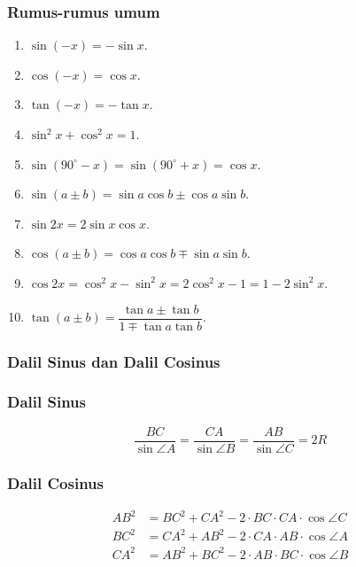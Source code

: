 \documentclass[11pt]{scrartcl}
\begin{document}
\subsubsection{Rumus-rumus umum}
\begin{enumerate}
    \item $\sin (-x) = -\sin x$.
    \item $\cos (-x) = \cos x$.
    \item $\tan(-x) = -\tan x$.
    \item $\sin^2 x + \cos^2 x = 1$.
    \item $\sin(90^\circ-x)=\sin(90^\circ+x)=\cos x$.
    \item $\sin(a \pm b) = \sin a \cos b \pm \cos a \sin b$.
    \item $\sin 2x = 2\sin x \cos x$.
    \item $\cos(a \pm b) = \cos a \cos b \mp \sin a \sin b$.
    \item $\cos 2x = \cos^2 x - \sin^2 x = 2\cos^2 x -1 = 1-2\sin^2 x$.
    \item $\tan(a \pm b) = \dfrac{\tan a \pm \tan b}{1 \mp \tan a \tan b}$.
\end{enumerate}


\subsubsection{Dalil Sinus dan Dalil Cosinus}
\begin{center}
\end{center}
    \subsubsection{Dalil Sinus}
    $$\dfrac{BC}{\sin \angle A} = \dfrac{CA}{\sin \angle B}= \dfrac{AB}{\sin \angle C} = 2R$$
    
    \subsubsection{Dalil Cosinus}
    \begin{align*}
        AB^2 &= BC^2 + CA^2 - 2\cdot BC \cdot CA \cdot \cos \angle C\\
        BC^2 &= CA^2 + AB^2 - 2\cdot CA \cdot AB \cdot \cos \angle A\\
        CA^2 &= AB^2 + BC^2 - 2\cdot AB \cdot BC \cdot \cos \angle B
    \end{align*}
\end{document}
